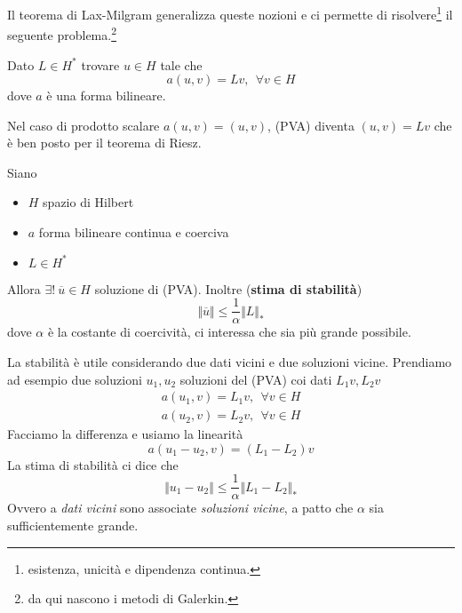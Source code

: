 \documentclass[10pt,a4paper,twoside,openright]{book}
\begin{document}
Il teorema di Lax-Milgram generalizza queste nozioni e ci permette di risolvere\footnote{esistenza, unicità e dipendenza continua.} il seguente problema.\footnote{da qui nascono i metodi di Galerkin.}
\begin{definition}
	 Dato $L\in H^{*}$ trovare $u\in H$ tale che
	\begin{equation*}
		a(u,v) =Lv,\ \ \forall v\in H
	\end{equation*}
	dove $a$ è una forma bilineare.
\end{definition}
Nel caso di prodotto scalare $a(u,v) =(u,v)$, (PVA) diventa $(u,v) =Lv$ che è ben posto per il teorema di Riesz.
\begin{theorem}
	 Siano
	\begin{itemize}
		\item $H$ spazio di Hilbert
		\item $a$ forma bilineare continua e coerciva
		\item $L\in H^{*}$
	\end{itemize}
	
	Allora $\exists !\ \overline{u} \in H$ soluzione di (PVA). Inoltre (\textbf{stima di stabilità})
	\begin{equation*}
		\Vert \overline{u}\Vert \leqslant \frac{1}{\alpha }\Vert L\Vert _{*}
	\end{equation*}
	dove $\alpha $ è la costante di coercività, ci interessa che sia più grande possibile.
\end{theorem}
\begin{oss}
	La stabilità è utile considerando due dati vicini e due soluzioni vicine. Prendiamo ad esempio due soluzioni $u_{1},u_{2}$ soluzioni del (PVA) coi dati $L_{1} v,L_{2} v$
	\begin{gather*}
		a(u_{1},v) =L_{1} v,\ \ \forall v\in H\\
		a(u_{2},v) =L_{2} v,\ \ \forall v\in H
	\end{gather*}
	Facciamo la differenza e usiamo la linearità
	\begin{equation*}
		a(u_{1} -u_{2},v) =(L_{1} -L_{2}) v
	\end{equation*}
	La stima di stabilità ci dice che
	\begin{equation*}
		\Vert u_{1} -u_{2}\Vert \leqslant \frac{1}{\alpha }\Vert L_{1} -L_{2}\Vert _{*}
	\end{equation*}
	Ovvero a \textit{dati vicini} sono associate \textit{soluzioni vicine}, a patto che $\alpha $ sia sufficientemente grande.
\end{oss}
\end{document}
